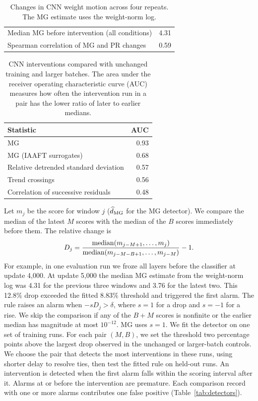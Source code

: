 {\begin{table}[t]
\centering\small
\caption{Changes in CNN weight motion across four repeats. The MG estimate uses the weight-norm log.}
\label{tab:cnn-graded}

\par\smallskip
\begin{tabular}{@{}lr@{}}
Median MG before intervention (all conditions) & 4.31 \\
Spearman correlation of MG and PR changes & 0.59 \\
\end{tabular}
\end{table}

\begin{table}[t]
\centering\small
\caption{CNN interventions compared with unchanged training and larger batches. The area under the receiver operating characteristic curve (AUC) measures how often the intervention run in a pair has the lower ratio of later to earlier medians.}
\label{tab:cnn-separation}
\begingroup
\begin{tabular}{lr}
\toprule
Statistic & AUC \\
\midrule
MG & 0.93 \\
MG (IAAFT surrogates) & 0.68 \\
Relative detrended standard deviation & 0.57 \\
Trend crossings & 0.56 \\
Correlation of successive residuals & 0.48 \\
\bottomrule
\end{tabular}
\endgroup
\end{table}

Let $m_j$ be the score for window $j$ ($\widehat d_{\mathrm{MG}}$ for the MG detector). We compare the median of the latest $M$ scores with the median of the $B$ scores immediately before them. The relative change is
\begin{equation}
D_j=\frac{\operatorname{median}(m_{j-M+1},\ldots,m_j)}
{\operatorname{median}(m_{j-M-B+1},\ldots,m_{j-M})}-1.
\label{eq:detector}
\end{equation}
For example, in one evaluation run we froze all layers before the classifier at update 4,000. At update 5,000 the median MG estimate from the weight-norm log was 4.31 for the previous three windows and 3.76 for the latest two. This 12.8\% drop exceeded the fitted 8.83\% threshold and triggered the first alarm.
The rule raises an alarm when $-sD_j>\delta$, where $s=1$ for a drop and $s=-1$ for a rise. We skip the comparison if any of the $B+M$ scores is nonfinite or the earlier median has magnitude at most $10^{-12}$. MG uses $s=1$. We fit the detector on one set of training runs. For each pair $(M,B)$, we set the threshold two percentage points above the largest drop observed in the unchanged or larger-batch controls. We choose the pair that detects the most interventions in these runs, using shorter delay to resolve ties, then test the fitted rule on held-out runs. An intervention is detected when the first alarm falls within the scoring interval after it. Alarms at or before the intervention are premature. Each comparison record with one or more alarms contributes one false positive (Table~\ref{tab:detectors}).

}
